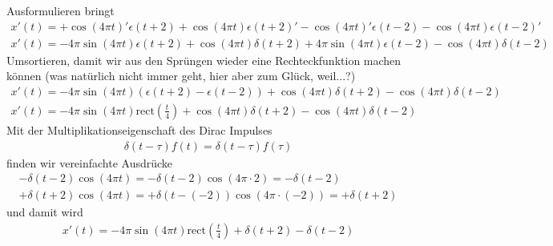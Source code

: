 \begin{ExCalc}
Ausformulieren bringt
\begin{align}x'(t)=
+ \cos(4\pi t)' \epsilon(t+2) + \cos(4\pi t) \epsilon(t+2)'
- \cos(4\pi t)' \epsilon(t-2) - \cos(4\pi t) \epsilon(t-2)'
\end{align}
\begin{align}x'(t)=
- 4\pi\sin(4\pi t) \epsilon(t+2) + \cos(4\pi t) \delta(t+2)
+ 4\pi\sin(4\pi t) \epsilon(t-2) - \cos(4\pi t) \delta(t-2)
\end{align}
Umsortieren, damit wir aus den Sprüngen wieder eine Rechteckfunktion machen können
(was natürlich nicht immer geht, hier aber zum Glück, weil...?)
\begin{align}x'(t)=
- 4\pi\sin(4\pi t) (\epsilon(t+2) - \epsilon(t-2))
+ \cos(4\pi t) \delta(t+2)
- \cos(4\pi t) \delta(t-2)
\end{align}
\begin{align}x'(t)=
- 4\pi\sin(4\pi t) \mathrm{rect}(\frac{t}{4})
+ \cos(4\pi t) \delta(t+2)
- \cos(4\pi t) \delta(t-2)
\end{align}
Mit der Multiplikationseigenschaft des Dirac Impulses
\begin{align}
\delta(t-\tau) f(t) = \delta(t-\tau) f(\tau)
\end{align}
finden wir vereinfachte Ausdrücke
\begin{align}
- \delta(t-2) \cos(4\pi t) = - \delta(t-2) \cos(4\pi \cdot 2) = - \delta(t-2)\\
+ \delta(t+2) \cos(4\pi t) = + \delta(t-(-2)) \cos(4\pi \cdot (-2)) = + \delta(t+2)
\end{align}
und damit wird
\begin{align}x'(t)=
- 4\pi\sin(4\pi t) \mathrm{rect}(\frac{t}{4})
+ \delta(t+2)
- \delta(t-2)
\end{align}
\end{ExCalc}

